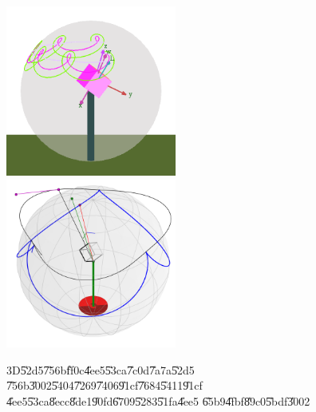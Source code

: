 \begin{figure}[th]
\caption{3D\U{52d5}\U{756b}\U{ff0c}\U{4ee5}\U{53ca}\U{7c0d}\U{7a7a}\U{52d5}%
\U{756b}\U{3002}\U{5404}\U{7269}\U{7406}\U{91cf}\U{7684}\U{5411}\U{91cf}%
\U{4ee5}\U{53ca}\U{8ecc}\U{8de1}\U{90fd}\U{6709}\U{5283}\U{51fa}\U{4ee5}%
\U{65b9}\U{4fbf}\U{89c0}\U{5bdf}\U{3002}}
\begin{center}
\includegraphics[width=0.5\textwidth]{./figs/jpap143.png}%
\includegraphics[width=0.5\textwidth]{./figs/L_not_circle.png}
\end{center}
\end{figure}

\bigskip

